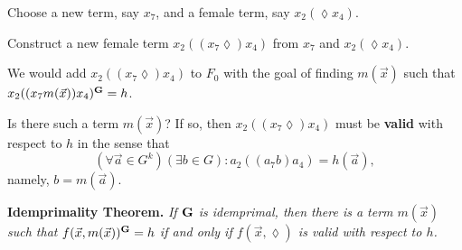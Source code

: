 \documentclass{beamer}
\newcommand{\lz}{{\lozenge}}
\newcommand{\G}{{\rm{\textbf{G}}}}
\newcommand{\va}{\vec a}
\newcommand{\vx}{\vec x}
\begin{document}
\begin{frame}

Choose a new term, say $x_7$, and a female term, say $x_2(\lz x_4)$.  \pause
\medskip

Construct a new female term $x_2((x_7\lz)x_4)$ from $x_7$ and $x_2(\lz x_4)$.\pause
\medskip
 
We would add $x_2((x_7\lz)x_4)$ to $F_0$  with the goal of finding  $m(\vx)$ such that $x_2((x_7m(\vx))x_4)^\G = h$.
\pause
\medskip

Is there such a term $m(\vx)$?  \pause  If so, then $x_2((x_7\lz)x_4)$ must be \textbf{valid} with respect to $h$ in the sense that
\[
(\forall \va\in G^k) (\exists b\in G) :  a_2((a_7b)a_4) = h(\va), 
\]
namely, $b = m(\va)$.  
\medskip
\pause 

\textbf{Idemprimality Theorem. } {\it If\/ $\G$ is idemprimal, then there is a term $m(\vx)$ such that $f(\vx,m(\vx))^\G = h$ if and only if $f(\vx,\lz)$ is valid with respect to $h$.}   

\end{frame}
\end{document}
